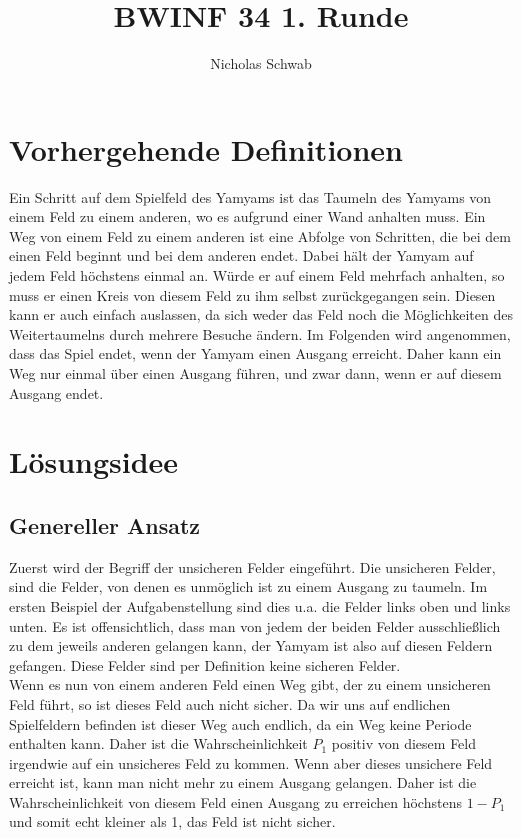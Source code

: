 \documentclass[12pt]{article}
\title{BWINF 34 1. Runde}
\author{Nicholas Schwab}
\begin{document}
\tableofcontents
\newpage
\section{Vorhergehende Definitionen}
Ein Schritt auf dem Spielfeld des Yamyams ist das Taumeln des Yamyams von einem Feld zu einem anderen, wo es aufgrund einer Wand anhalten muss. Ein Weg von einem Feld zu einem anderen ist eine Abfolge von Schritten, die bei dem einen Feld beginnt und bei dem anderen endet. Dabei hält der Yamyam auf jedem Feld höchstens einmal an. Würde er auf einem Feld mehrfach anhalten, so muss er einen Kreis von diesem Feld zu ihm selbst zurückgegangen sein. Diesen kann er auch einfach auslassen, da sich weder das Feld noch die Möglichkeiten des Weitertaumelns durch mehrere Besuche ändern. Im Folgenden wird angenommen, dass das Spiel endet, wenn der Yamyam einen Ausgang erreicht. Daher kann ein Weg nur einmal über einen Ausgang führen, und zwar dann, wenn er auf diesem Ausgang endet.
\section{Lösungsidee}
\subsection{Genereller Ansatz}
Zuerst wird der Begriff der unsicheren Felder eingeführt. Die unsicheren Felder, sind die Felder, von denen es unmöglich ist zu einem Ausgang zu taumeln. Im ersten Beispiel der Aufgabenstellung sind dies u.a. die Felder links oben und links unten. Es ist offensichtlich, dass man von jedem der beiden Felder ausschließlich zu dem jeweils anderen gelangen kann, der Yamyam ist also auf diesen Feldern gefangen. Diese Felder sind per Definition keine sicheren Felder. \\

Wenn es nun von einem anderen Feld einen Weg gibt, der zu einem unsicheren Feld führt, so ist dieses Feld auch nicht sicher. Da wir uns auf endlichen Spielfeldern befinden ist dieser Weg auch endlich, da ein Weg keine Periode enthalten kann. Daher ist die Wahrscheinlichkeit $P_1$ positiv von diesem Feld irgendwie auf ein unsicheres Feld zu kommen. Wenn aber dieses unsichere Feld erreicht ist, kann man nicht mehr zu einem Ausgang gelangen. Daher ist die Wahrscheinlichkeit von diesem Feld einen Ausgang zu erreichen höchstens $1-P_1$ und somit echt kleiner als 1, das Feld ist nicht sicher. \\
\end{document}
